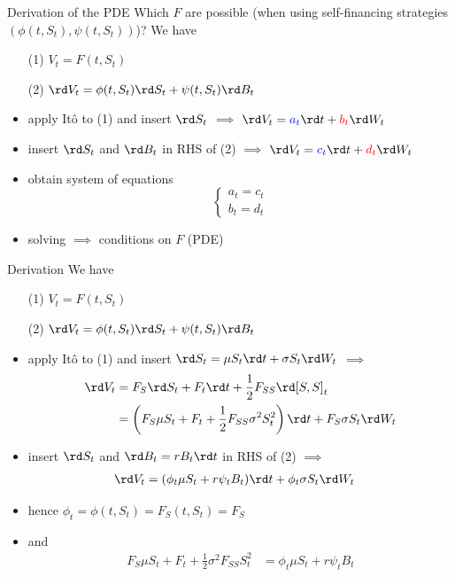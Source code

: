 \documentclass[pdf, handout]{beamer}
\begin{document}
\begin{frame}{Derivation of the PDE}
Which $F$ are possible (when using self-financing strategies $(\phi(t,S_t),\psi(t,S_t))$)?
We have
\begin{itemize}
\item[(1)] $V_t=F(t,S_t)$
\item[(2)] $\rd V_t= \phi(t,S_t) \rd S_t + \psi(t,S_t) \rd B_t$
\end{itemize}
\vspace{-.2cm}
\begin{itemize}
\item apply It\^{o} to (1) and insert $\rd S_t$  $\implies$
$
\rd V_t=\textcolor{blue}{a_t} \rd t + \textcolor{red}{b_t} \rd W_t
$
\item insert $\rd S_t$ and $\rd B_t$ in RHS of (2) $\implies$
$\rd V_t=\textcolor{blue}{c_t} \rd t + \textcolor{red}{d_t} \rd W_t$
\item obtain system of equations
\[
\left\{
  \begin{array}{ll}
    a_t=c_t  \\
    b_t=d_t %
  \end{array}
\right.
\]
\item solving $\implies$ conditions on $F$ (PDE)
\end{itemize}
\end{frame}

\begin{frame}{Derivation}
We have
\begin{itemize}
\item[(1)] $V_t=F(t,S_t)$
\item[(2)] $\rd V_t= \phi(t,S_t) \rd S_t + \psi(t,S_t) \rd B_t$
\end{itemize}
\vspace{-.2cm}
\begin{itemize}
\item apply It\^{o} to (1) and insert $\rd S_t = \mu S_t \rd t + \sigma S_t \rd W_t$  $\implies$
\begin{align*}
\rd V_t &= F_S \rd S_t + F_t \rd t + \frac{1}{2} F_{SS} \rd [S,S]_t 
\\
&=  \left( F_S \mu S_t +F_t +  \frac{1}{2} F_{SS} \sigma^2 S_t^2  \right) 
\rd t + F_S \sigma S_t \rd W_t 
\end{align*}
\item insert $\rd S_t$ and $\rd B_t=rB_t\rd t$ in RHS of (2) $\implies$
\begin{align*}
\rd V_t &= (\phi_t \mu S_t + r\psi_t B_t) \rd t +  \phi_t \sigma S_t \rd W_t
\end{align*}
\item hence $\phi_t = \phi(t,S_t) = F_{S}(t,S_t)=F_S$
\item and
\begin{align*}
F_S \mu S_t +F_t +  \frac{1}{2}\sigma^2 F_{SS} S_t^2    
&= \phi_t \mu S_t + r\psi_t B_t
\end{align*}
\end{itemize}
\end{frame}
\end{document}
